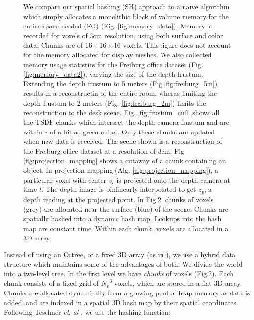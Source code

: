 \documentclass[10pt,twocolumn,letterpaper]{article}
\newcommand{\figref}[1]{Fig.\ref{#1}}
\begin{document}
\begin{figure}
\begin{minipage}{0.23\linewidth}
\begin{subfigure}{\linewidth}
 	      \caption{}
 	  	\label{fig:chunks} 
 	  \end{subfigure} 
   \end{minipage}
  \caption{ We compare our spatial hashing (SH)
      approach to a na\"{\i}ve algorithm which simply allocates a monolithic
      block of volume memory for the entire space needed (FG) (Fig.
      \ref{fig:memory_data}).
      Memory is recorded for voxels of 3cm resolution, using both surface and
      color data. Chunks are of $16 \times 16 \times 16$ voxels. This figure
      does not account for the memory allocated for display meshes. We also collected memory
      usage statistics for the Freiburg \cite{FREIBURG} office dataset (Fig.
      \ref{fig:memory_data2}), varying the size of the depth frustum. Extending
      the depth frustum to 5 meters (\figref{fig:freiburg_5m}) results in a reconstructin of the entire
      room, wheras limiting the depth frustum to 2 meters (Fig.
      \ref{fig:freiburg_2m}) limits the reconstruction to the desk scene. Fig.
      \ref{fig:frustum_cull} shows all the TSDF chunks which intersect the depth camera frustum  and are within $\tau$ of a hit as green cubes. Only these
      chunks are updated when new data is received. The scene shown is a
      reconstruction of the Freiburg office \cite{FREIBURG} dataset at a
      resolution of 3cm. Fig \ref{fig:projection_mapping} shows a cutaway of a
      chunk containing an object. In projection mapping (Alg. \ref{alg:projection_mapping}),  a particular voxel with
      center $v_c$ is projected onto the depth camera at time $t$. The depth image is binlinearly interpolated to get
      $z_p$, a depth reading at the projected point. In \figref{fig:chunks}, chunks of voxels (grey) are allocated near
  the surface (blue) of the scene. Chunks are spatially hashed \cite{SpatialHashing} into a
      dynamic hash map. Lookups into the hash map are constant time. Within each
      chunk, voxels are allocated in a 3D array.}
\end{figure} 

Instead of using an Octree, or a fixed 3D array (as in \cite{Newcombe,
Whelan2013}), we use a hybrid data structure which maintains some of the
advantages of both. We divide the world into a two-level tree. In the first
level we have \emph{chunks} of voxels (\figref{fig:chunks}). Each chunk consists of a
fixed grid of ${N_v}^3$ voxels, which are stored in a flat 3D array. Chunks are
allocated dynamically from a growing pool of heap memory as data is added, and
are indexed in a spatial 3D hash map \cite{SpatialHashing} by their spatial
coordinates. Following Teschner \emph{et. al} \cite{SpatialHashing}, we use the
hashing function:
\end{document}
